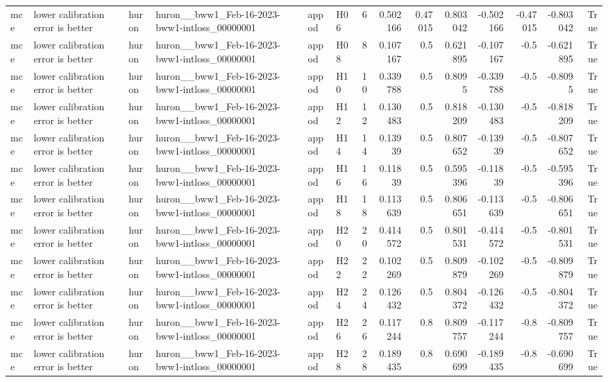 \begin{longtable}{llllllrrrrrrrr}
mce & lower calibration error is better & huron & huron\_\_bww1\_Feb-16-2023-bww1-intloss\_00000001 & appod & H06 & 6 & 0.502166 & 0.47015 & 0.803042 & -0.502166 & -0.47015 & -0.803042 & True \\
mce & lower calibration error is better & huron & huron\_\_bww1\_Feb-16-2023-bww1-intloss\_00000001 & appod & H08 & 8 & 0.107167 & 0.5 & 0.621895 & -0.107167 & -0.5 & -0.621895 & True \\
mce & lower calibration error is better & huron & huron\_\_bww1\_Feb-16-2023-bww1-intloss\_00000001 & appod & H10 & 10 & 0.339788 & 0.5 & 0.8095 & -0.339788 & -0.5 & -0.8095 & True \\
mce & lower calibration error is better & huron & huron\_\_bww1\_Feb-16-2023-bww1-intloss\_00000001 & appod & H12 & 12 & 0.130483 & 0.5 & 0.818209 & -0.130483 & -0.5 & -0.818209 & True \\
mce & lower calibration error is better & huron & huron\_\_bww1\_Feb-16-2023-bww1-intloss\_00000001 & appod & H14 & 14 & 0.13939 & 0.5 & 0.807652 & -0.13939 & -0.5 & -0.807652 & True \\
mce & lower calibration error is better & huron & huron\_\_bww1\_Feb-16-2023-bww1-intloss\_00000001 & appod & H16 & 16 & 0.11839 & 0.5 & 0.595396 & -0.11839 & -0.5 & -0.595396 & True \\
mce & lower calibration error is better & huron & huron\_\_bww1\_Feb-16-2023-bww1-intloss\_00000001 & appod & H18 & 18 & 0.113639 & 0.5 & 0.806651 & -0.113639 & -0.5 & -0.806651 & True \\
mce & lower calibration error is better & huron & huron\_\_bww1\_Feb-16-2023-bww1-intloss\_00000001 & appod & H20 & 20 & 0.414572 & 0.5 & 0.801531 & -0.414572 & -0.5 & -0.801531 & True \\
mce & lower calibration error is better & huron & huron\_\_bww1\_Feb-16-2023-bww1-intloss\_00000001 & appod & H22 & 22 & 0.102269 & 0.5 & 0.809879 & -0.102269 & -0.5 & -0.809879 & True \\
mce & lower calibration error is better & huron & huron\_\_bww1\_Feb-16-2023-bww1-intloss\_00000001 & appod & H24 & 24 & 0.126432 & 0.5 & 0.804372 & -0.126432 & -0.5 & -0.804372 & True \\
mce & lower calibration error is better & huron & huron\_\_bww1\_Feb-16-2023-bww1-intloss\_00000001 & appod & H26 & 26 & 0.117244 & 0.8 & 0.809757 & -0.117244 & -0.8 & -0.809757 & True \\
mce & lower calibration error is better & huron & huron\_\_bww1\_Feb-16-2023-bww1-intloss\_00000001 & appod & H28 & 28 & 0.189435 & 0.8 & 0.690699 & -0.189435 & -0.8 & -0.690699 & True \\

\end{longtable}
